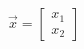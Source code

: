 \documentclass[preview]{standalone}
\begin{document}
\begin{align*}
\vec{x}=\begin{bmatrix} x_1 \\ x_2 \end{bmatrix}
\end{align*}
\end{document}
